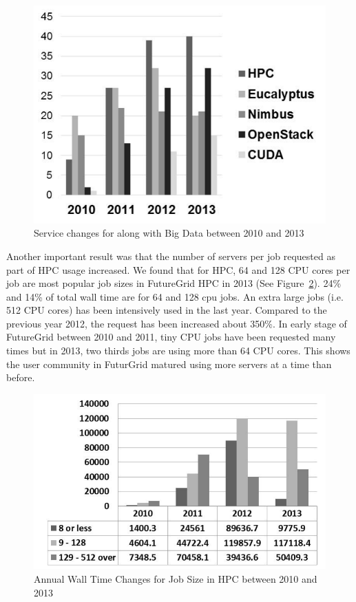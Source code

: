 \documentclass{sig-alternate-05-2015}
\begin{document}
\begin{figure}[htb]
  \centering
    \includegraphics[width=1.0\columnwidth]{images/bigdata.pdf} 
  \caption{Service changes for along with Big Data between 2010 and 2013}\label{F:bigdata} 
\end{figure} 

Another important result was that the number of servers per job requested as part of HPC usage increased. We found that for HPC, 64 and 128 CPU cores per job are most popular job sizes in FutureGrid HPC in 2013 (See Figure~\ref{F:bigdatainhpc}). 24\% and 14\% of total wall time are for 64 and 128 cpu jobs. An extra large jobs (i.e. 512 CPU cores) has been intensively used in the last year. Compared to the previous year 2012, the request has been increased about 350\%. In early stage of FutureGrid between 2010 and 2011, tiny CPU jobs have been requested many times but in 2013, two thirds jobs are using more than 64 CPU cores. This shows the user community in FuturGrid matured using more servers at a time than before.

\begin{figure}[htb]
  \centering
    \includegraphics[width=1.0\columnwidth]{images/bigdatainhpc.pdf} 
  \caption{Annual Wall Time Changes for Job Size in HPC between 2010 and 2013}\label{F:bigdatainhpc} 
\end{figure} 
\end{document}
